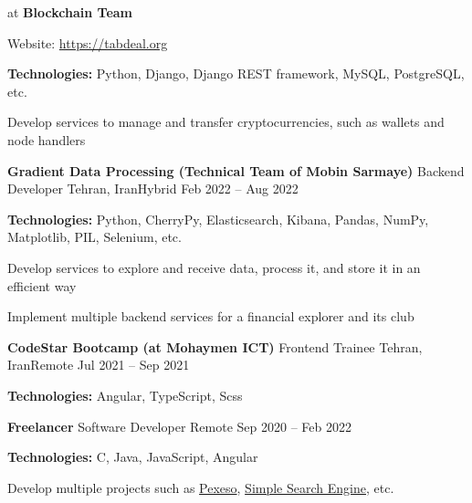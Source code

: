 \documentclass[]{awesome-cv}
\begin{document}
\begin{cventries}
	{\begin{cvitems}
		\vspace{1mm}
		\item[] {\hspace{-9mm}} at \textbf{Blockchain Team}
		\vspace{1mm}
		\item[] {\hspace{-9mm} Website: \href{https://tabdeal.org}{\textcolor{awesome}{https://tabdeal.org}}}
		\vspace{1mm}
		\item {\textbf{Technologies:} Python, Django, Django REST framework, MySQL, PostgreSQL, etc.}
		\vspace{1mm}
		\item {Develop services to manage and transfer cryptocurrencies, such as wallets and node handlers}
	\end{cvitems}}
	\cventry
	{\textbf{Gradient Data Processing (Technical Team of Mobin Sarmaye)}}
	{Backend Developer}
	{Tehran, Iran{\enskip\cdotp\enskip}Hybrid}
	{Feb 2022 – Aug 2022}
	{\begin{cvitems}
		\vspace{1mm}
		\item {\textbf{Technologies:} Python, CherryPy, Elasticsearch, Kibana, Pandas, NumPy, Matplotlib, PIL, Selenium, etc.}
		\vspace{1mm}
		\item {Develop services to explore and receive data, process it, and store it in an efficient way}
		\vspace{1mm}
		\item {Implement multiple backend services for a financial explorer and its club}
	\end{cvitems}}
	\cventry
	{\textbf{CodeStar Bootcamp (at Mohaymen ICT)}}
	{Frontend Trainee}
	{Tehran, Iran{\enskip\cdotp\enskip}Remote}
	{Jul 2021 – Sep 2021}
	{\begin{cvitems}
		\vspace{1mm}
		\item {\textbf{Technologies:} Angular, TypeScript, Scss}
	\end{cvitems}}
	\cventry
	{\textbf{Freelancer}}
	{Software Developer}
	{Remote}
	{Sep 2020 – Feb 2022}
	{\begin{cvitems}
		\vspace{1mm}
		\item {\textbf{Technologies:} C, Java, JavaScript, Angular}
		\vspace{1mm}
		\item {Develop multiple projects such as \href{https://github.com/AshkanShakiba/Pexeso}{\textcolor{awesome}{Pexeso}}, \href{https://github.com/AshkanShakiba/Joojle}{\textcolor{awesome}{Simple Search Engine}}, etc.}
	\end{cvitems}}
\end{cventries}
\end{document}
